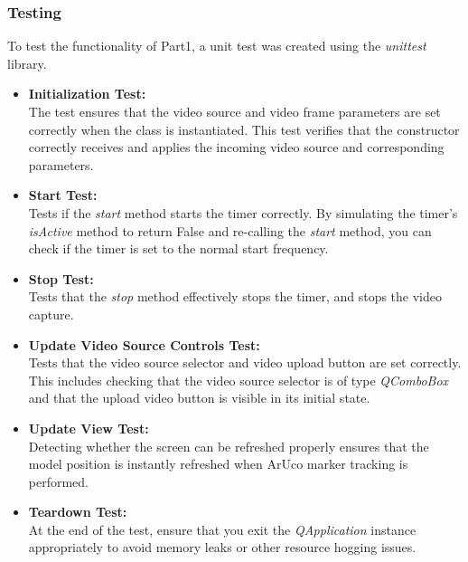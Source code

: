 \documentclass[12pt]{article}
\begin{document}
\subsubsection{Testing}
To test the functionality of Part1, a unit test was created using the \emph{unittest} library\cite{PythonUnittest}.
\begin{itemize}
      \item \textbf{Initialization Test:}
      \\
      The test ensures that the video source and video frame parameters are set correctly when the class is instantiated. This test verifies that the constructor correctly receives and applies the incoming video source and corresponding parameters.
      \item \textbf{Start Test:}
      \\
      Tests if the \emph{start} method starts the timer correctly. By simulating the timer's \emph{isActive} method to return False and re-calling the \emph{start} method, you can check if the timer is set to the normal start frequency.
      \item \textbf{Stop Test:}
      \\
      Tests that the \emph{stop} method effectively stops the timer, and stops the video capture.
      \item \textbf{Update Video Source Controls Test:}
      \\
      Tests that the video source selector and video upload button are set correctly. This includes checking that the video source selector is of type \emph{ QComboBox} and that the upload video button is visible in its initial state.
      \item \textbf{Update View Test:}
      \\
      Detecting whether the screen can be refreshed properly ensures that the model position is instantly refreshed when ArUco marker tracking is performed.
      \item \textbf{Teardown Test:}
      \\
      At the end of the test, ensure that you exit the \emph{QApplication} instance appropriately to avoid memory leaks or other resource hogging issues.  
\end{itemize}
\end{document}
